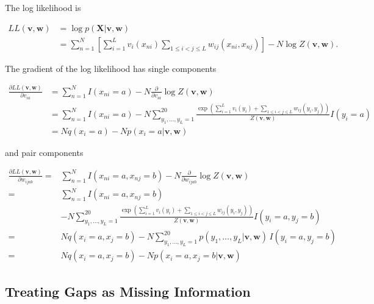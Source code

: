 \documentclass[11pt,a4paper,twoside]{book}
\newcommand{\eq}{\!=\!}
\newcommand{\LL}{L\!L(\mathbf{v}, \mathbf{w})}
\renewcommand{\v}{\mathbf{v}}
\newcommand{\via}{v_{ia}}
\newcommand{\w}{\mathbf{w}}
\newcommand{\wijab}{w_{ijab}}
\newcommand{\X}{\mathbf{X}}
\theoremstyle{definition}
\theoremstyle{definition}
\theoremstyle{remark}
\begin{document}
The log likelihood is

\begin{align}
    \LL &= \log p(\X | \v, \w) \nonumber \\
        &= \sum_{n=1}^N \left [  \sum_{i=1}^L v_i(x_{ni}) \sum_{1 \leq i < j \leq L} w_{ij}(x_{ni}, x_{nj})   \right ] - N \log Z(\v, \w) .
\end{align}

The gradient of the log likelihood has single components

\begin{align}
    \frac{\partial \LL}{\partial \via} &= \sum_{n=1}^N I(x_{ni} \eq a)  - N \frac{\partial}{\partial \via} \log Z(\v,\w) \nonumber\\
                                        &= \sum_{n=1}^N I(x_{ni} \eq a) - N \sum_{y_1,\ldots,y_L=1}^{20} \!\! \frac{ \exp \left( \sum_{i=1}^L v_i(y_i) + \sum_{1 \le i < j \le L} w_{ij}(y_i,y_j) \right)}{Z(\v,\w)}  I(y_i \eq a) \nonumber\\
                                        &=  N q(x_{i} \eq a) - N p(x_i \eq a | \v,\w) 
\label{eq:gradient-LL-single}
\end{align}

and pair components

\begin{align}
    \frac{\partial \LL}{\partial \wijab} =& \sum_{n=1}^N I(x_{ni}=a, x_{nj}=b)  - N \frac{\partial}{\partial \wijab} \log Z(\v,\w) \nonumber\\
                                        =& \sum_{n=1}^N I(x_{ni} \eq a, x_{nj} \eq b) \nonumber\\
                                        & - N \sum_{y_1,\ldots,y_L=1}^{20} \!\! \frac{ \exp \left( \sum_{i=1}^L v_i(y_i) + \sum_{1 \le i < j \le L} w_{ij}(y_i,y_j) \right)}{Z(\v,\w)}  I(y_i \eq a, y_j \eq b) \nonumber\\
                                        =&  N q(x_{i} \eq a, x_{j} \eq b) - N \sum_{y_1,\ldots,y_L=1}^{20} p(y_1, \ldots, y_L | \v,\w) \, I(y_i \eq a, y_j \eq b) \nonumber\\
                                        =&  N q(x_{i} \eq a, x_{j} \eq b) - N p(x_i \eq a, x_j \eq b | \v,\w) 
\label{eq:gradient-LL-pair}
\end{align}

\subsection{Treating Gaps as Missing Information}\label{gap-treatment}
\end{document}
